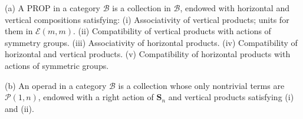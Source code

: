 (a) A PROP in a category $\mathcal{B}$ is a collection in $\mathcal{B}$, endowed with horizontal and vertical compositions satisfying:
(i) Associativity of vertical products; units for them in $\mathcal{E}(m, m)$.
(ii) Compatibility of vertical products with actions of symmetry groups.
(iii) Associativity of horizontal products.
(iv) Compatibility of horizontal and vertical products.
(v) Compatibility of horizontal products with actions of symmetric groups.

(b) An operad in a category $\mathcal{B}$ is a collection whose only nontrivial terms are $\mathcal{P}(1, n)$, endowed with a right action of $\mathbf{S}_n$ and vertical products satisfying (i) and (ii).
